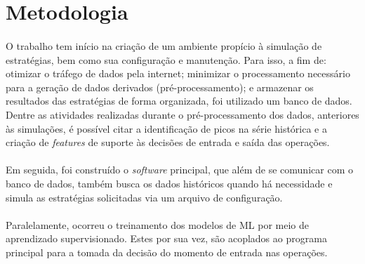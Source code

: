 \FloatBarrier
\section{Metodologia}

\paragraph{} O trabalho tem início na criação de um ambiente propício à simulação de estratégias, bem como sua configuração e manutenção. Para isso, a fim de: otimizar o tráfego de dados pela internet; minimizar o processamento necessário para a geração de dados derivados (pré-processamento); e armazenar os resultados das estratégias de forma organizada, foi utilizado um banco de dados. Dentre as atividades realizadas durante o pré-processamento dos dados, anteriores às simulações, é possível citar a identificação de picos na série histórica e a criação de \textit{features} de suporte às decisões de entrada e saída das operações.


\paragraph{} Em seguida, foi construído o \textit{software} principal, que além de se comunicar com o banco de dados, também busca os dados históricos quando há necessidade e simula as estratégias solicitadas via um arquivo de configuração.

\paragraph{} Paralelamente, ocorreu o treinamento dos modelos de ML por meio de aprendizado supervisionado. Estes por sua vez, são acoplados ao programa principal para a tomada da decisão do momento de entrada nas operações.

